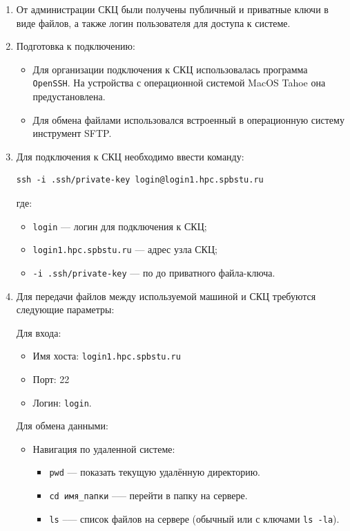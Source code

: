 \documentclass{article}[14pt]
\begin{document}
\begin{enumerate}
	\item От администрации СКЦ были получены публичный и приватные ключи в виде файлов, а также логин пользователя для доступа к системе.
	\item Подготовка к подключению:
	
	\begin{itemize}
		\item Для организации подключения к СКЦ использовалась программа \texttt{OpenSSH}. На устройства с операционной системой MacOS Tahoe
		она предустановлена.
		\item Для обмена файлами использовался встроенный в операционную систему инструмент SFTP.
	\end{itemize}

	\item Для подключения к СКЦ необходимо ввести команду:
	
	\begin{lstlisting}
ssh -i .ssh/private-key login@login1.hpc.spbstu.ru
	\end{lstlisting}

	где:

	\begin{itemize}
		\item \texttt{login} --- логин для подключения к СКЦ;
		\item \texttt{login1.hpc.spbstu.ru} --- адрес узла СКЦ;
		\item \texttt{-i .ssh/private-key} --- по до приватного файла-ключа.
	\end{itemize}

	\item Для передачи файлов между используемой машиной и СКЦ требуются следующие параметры:
	
	Для входа:
	\begin{itemize}
		\item Имя хоста: \texttt{login1.hpc.spbstu.ru}
		\item Порт: 22
		\item Логин: \texttt{login}.
	\end{itemize}

	Для обмена данными:
	\begin{itemize}
		\item Навигация по удаленной системе:
		\begin{itemize}
			\item \texttt{pwd} --- показать текущую удалённую директорию.
			\item \texttt{cd имя\_папки} --— перейти в папку на сервере.
			\item \texttt{ls} --— список файлов на сервере (обычный или с ключами \texttt{ls -la}).
		\end{itemize}


\end{itemize}
\end{enumerate}
\end{document}
